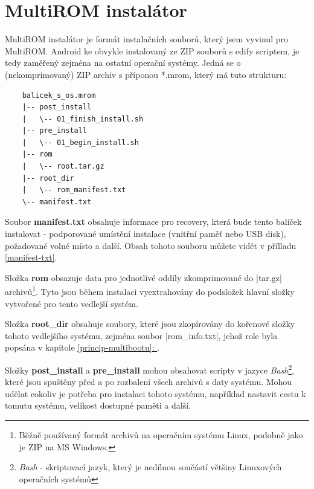 \documentclass[12pt, a4paper, oneside]{article}
\newcommand{\B}{\textbf} %
\newcommand{\It}{\textit}  %
\newcommand*{\fullref}[1]{\hyperref[{#1}]{\ref*{#1}: \uv{\nameref*{#1}}}}
\begin{document}
\section*{MultiROM instalátor}
\label{sec:installer}
MultiROM instalátor je formát instalačních souborů, který jsem vyvinul pro MultiROM. Android ke obvykle instalovaný ze ZIP souborů s edify scriptem, je tedy zaměřený zejména na ostatní operační systémy. Jedná se o (nekomprimovaný) ZIP archiv s příponou *.mrom, který má tuto strukturu:
\begin{verbatim}
    balicek_s_os.mrom
    |-- post_install
    |   \-- 01_finish_install.sh
    |-- pre_install
    |   \-- 01_begin_install.sh
    |-- rom
    |   \-- root.tar.gz
    |-- root_dir
    |   \-- rom_manifest.txt
    \-- manifest.txt
\end{verbatim}

Soubor \B{manifest.txt} obsahuje informace pro recovery, která bude tento balíček instalovat - podporované umístění instalace (vnitřní paměť nebo USB disk), požadované volné místo a další. Obsah tohoto souboru můžete vidět v přílladu \ref{manifest-txt}.

Složka \B{rom} obsazuje data pro jednotlivé oddíly zkomprimované do |tar.gz| archivů\footnote{Běžně používaný formát archivů na operačním systému Linux, podobně jako je ZIP na MS Windows.}. Tyto jsou během instalaci vyextrahovány do podsložek hlavní složky vytvořené pro tento vedlejší systém.

Složka \B{root\_dir} obsahuje soubory, které jsou zkopírovány do kořenové složky tohoto vedlejšího systému, zejména soubor |rom_info.txt|, jehož role byla popsána v kapitole \fullref{princip-multibootu}.

Složky \B{post\_install} a \B{pre\_install} mohou obsahovat scripty v jazyce \It{Bash}\footnote{\It{Bash} - skriptovací jazyk, který je nedílnou součástí většiny Linuxových operačních systémů}, které jsou spuštěny před a po rozbalení všech archivů s daty systému. Mohou udělat cokoliv je potřeba pro instalaci tohoto systému, například nastavit cestu k tomutu systému, velikost dostupné paměti a další.
\end{document}
